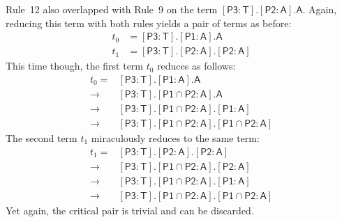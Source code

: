 \documentclass[headsepline,bibliography=totoc]{scrreport}
\newcommand{\namesym}[1]{\mathsf{#1}}
\newcommand{\proto}[1]{\bm{\mathsf{#1}}}
\newcommand{\assocsym}[2]{[\proto{#1}\colon\namesym{#2}]}
\theoremstyle{definition}
\theoremstyle{definition}
\theoremstyle{definition}
\begin{document}
Rule~12 also overlapped with Rule~9 on the term $\assocsym{P3}{T}.\assocsym{P2}{A}.\namesym{A}$. Again, reducing this term with both rules yields a pair of terms as before:
\begin{align*}
t_0&=\assocsym{P3}{T}.\assocsym{P1}{A}.\namesym{A}\\
t_1&=\assocsym{P3}{T}.\assocsym{P2}{A}.\assocsym{P2}{A}
\end{align*}
This time though, the first term $t_0$ reduces as follows:
\begin{align}
t_0=&\assocsym{P3}{T}.\assocsym{P1}{A}.\namesym{A}\nonumber\\
\rightarrow&\assocsym{P3}{T}.[\proto{P1}\cap\proto{P2}\colon\namesym{A}].\namesym{A}\tag{Rule 13}\\
\rightarrow&\assocsym{P3}{T}.[\proto{P1}\cap\proto{P2}\colon\namesym{A}].\assocsym{P1}{A}\tag{Rule 16}\\
\rightarrow&\assocsym{P3}{T}.[\proto{P1}\cap\proto{P2}\colon\namesym{A}].[\proto{P1}\cap\proto{P2}\colon\namesym{A}]\tag{Rule 19}
\end{align}
The second term $t_1$ miraculously reduces to the same term:
\begin{align}
t_1=&\assocsym{P3}{T}.\assocsym{P2}{A}.\assocsym{P2}{A}\nonumber\\
\rightarrow&\assocsym{P3}{T}.[\proto{P1}\cap\proto{P2}\colon\namesym{A}].\assocsym{P2}{A}\tag{Rule 13}\\
\rightarrow&\assocsym{P3}{T}.[\proto{P1}\cap\proto{P2}\colon\namesym{A}].\assocsym{P1}{A}\tag{Rule 18}\\
\rightarrow&\assocsym{P3}{T}.[\proto{P1}\cap\proto{P2}\colon\namesym{A}].[\proto{P1}\cap\proto{P2}\colon\namesym{A}]\tag{Rule 19}
\end{align}
Yet again, the critical pair is trivial and can be discarded.
\end{document}
